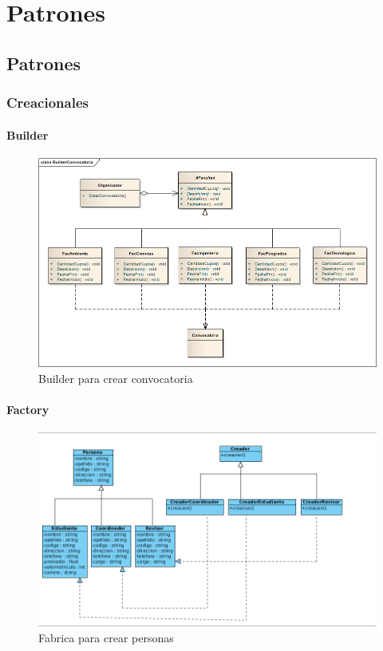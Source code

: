 \chapter{Patrones}
\section{Patrones}

\subsection{Creacionales}

\bigskip

\subsubsection{Builder}

\begin{figure}[th!]
	\centering
	\includegraphics[width=1.2\linewidth]{uml/Patrones/BuilderConvocatoria}
	\caption{Builder para crear convocatoria}
	\label{fig:Builder para convocatoria}
\end{figure}

\clearpage

\subsubsection{Factory}
\begin{figure}[th!]
	\centering
	\includegraphics[width=1.2\linewidth]{uml/Patrones/FactoryMethod}
	\caption{Fabrica para crear personas}
	\label{fig:Fabrica para crear personas}
\end{figure}

